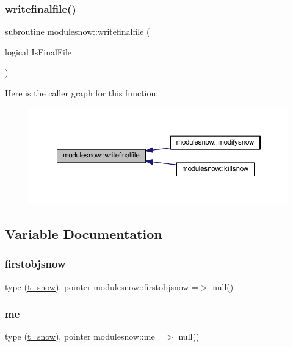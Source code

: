 \subsubsection{\texorpdfstring{writefinalfile()}{writefinalfile()}}
{\footnotesize\ttfamily subroutine modulesnow\+::writefinalfile (\begin{DoxyParamCaption}\item[{logical}]{Is\+Final\+File }\end{DoxyParamCaption})\hspace{0.3cm}{\ttfamily [private]}}

Here is the caller graph for this function\+:\nopagebreak
\begin{figure}[H]
\begin{center}
\leavevmode
\includegraphics[width=350pt]{namespacemodulesnow_a4a825586dc688763fa3df8c6402fe6c3_icgraph}
\end{center}
\end{figure}


\subsection{Variable Documentation}
\mbox{\label{namespacemodulesnow_a2d3dd12f242203d21e700da3e66dc4e0}} 
\subsubsection{\texorpdfstring{firstobjsnow}{firstobjsnow}}
{\footnotesize\ttfamily type (\mbox{\hyperlink{structmodulesnow_1_1t__snow}{t\+\_\+snow}}), pointer modulesnow\+::firstobjsnow =$>$ null()\hspace{0.3cm}{\ttfamily [private]}}

\mbox{\label{namespacemodulesnow_aefbccc67c85115a076712d1c6bca86f5}} 
\subsubsection{\texorpdfstring{me}{me}}
{\footnotesize\ttfamily type (\mbox{\hyperlink{structmodulesnow_1_1t__snow}{t\+\_\+snow}}), pointer modulesnow\+::me =$>$ null()\hspace{0.3cm}{\ttfamily [private]}}

